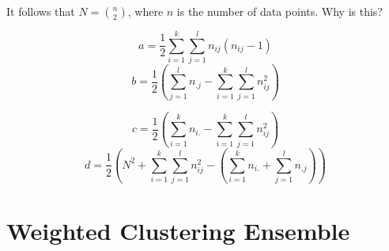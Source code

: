 \documentclass[11pt,fleqn]{book} %
\begin{document}
\begin{exercise}
It follows that $N = \binom{n}{2}$, where $n$ is the number of data points. Why is this?
\end{exercise}

\begin{multicols}{2}
$$ a = \frac{1}{2}\sum^{k}_{i=1}\sum^{l}_{j=1}n_{ij}(n_{ij} - 1) $$
$$ b = \frac{1}{2}(\sum^{l}_{j=1}n_{.j} - \sum^{k}_{i=1}\sum^{l}_{j=1}n_{ij}^2)$$

$$ c = \frac{1}{2}(\sum^{k}_{i=1}n_{i.} - \sum^{k}_{i=1}\sum^{l}_{j=1}n_{ij}^2)$$
$$ d = \frac{1}{2}(N^2 + \sum^{k}_{i=1}\sum^{l}_{j=1}n_{ij}^2 - (\sum^{k}_{i=1}n_{i.} + \sum^{l}_{j=1}n_{.j}))$$
\end{multicols}

\section{Weighted Clustering Ensemble}


\cleardoublepage
{}
\setlength{\columnsep}{0.75cm}
\printindex

\end{document}
